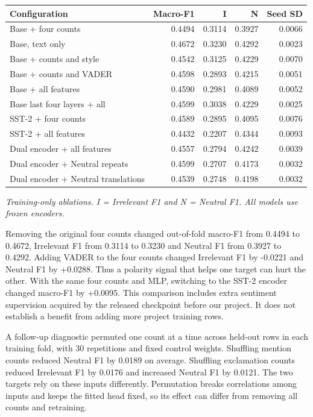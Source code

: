 \begin{center}\begin{minipage}{\linewidth}\centering\small
\begin{tabular}{lrrrr}
\toprule
Configuration & Macro-F1 & I & N & Seed SD \\
\midrule
Base + four counts & 0.4494 & 0.3114 & 0.3927 & 0.0066 \\
Base, text only & 0.4672 & 0.3230 & 0.4292 & 0.0023 \\
Base + counts and style & 0.4542 & 0.3125 & 0.4229 & 0.0070 \\
Base + counts and VADER & 0.4598 & 0.2893 & 0.4215 & 0.0051 \\
Base + all features & 0.4590 & 0.2981 & 0.4089 & 0.0052 \\
Base last four layers + all & 0.4599 & 0.3038 & 0.4229 & 0.0025 \\
SST-2 + four counts & 0.4589 & 0.2895 & 0.4095 & 0.0076 \\
SST-2 + all features & 0.4432 & 0.2207 & 0.4344 & 0.0093 \\
Dual encoder + all features & 0.4557 & 0.2794 & 0.4242 & 0.0039 \\
Dual encoder + Neutral repeats & 0.4599 & 0.2707 & 0.4173 & 0.0032 \\
Dual encoder + Neutral translations & 0.4539 & 0.2748 & 0.4198 & 0.0032 \\
\bottomrule
\end{tabular}
\par\smallskip\textit{Training-only ablations. I = Irrelevant F1 and N = Neutral F1. All models use frozen encoders.}
\end{minipage}\end{center}

Removing the original four counts changed out-of-fold macro-F1 from 0.4494 to 0.4672, Irrelevant F1 from 0.3114 to 0.3230 and Neutral F1 from 0.3927 to 0.4292. Adding VADER to the four counts changed Irrelevant F1 by -0.0221 and Neutral F1 by +0.0288. Thus a polarity signal that helps one target can hurt the other. With the same four counts and MLP, switching to the SST-2 encoder changed macro-F1 by +0.0095. This comparison includes extra sentiment supervision acquired by the released checkpoint before our project. It does not establish a benefit from adding more project training rows.

A follow-up diagnostic permuted one count at a time across held-out rows in each training fold, with 30 repetitions and fixed control weights. Shuffling mention counts reduced Neutral F1 by 0.0189 on average. Shuffling exclamation counts reduced Irrelevant F1 by 0.0176 and increased Neutral F1 by 0.0121. The two targets rely on these inputs differently. Permutation breaks correlations among inputs and keeps the fitted head fixed, so its effect can differ from removing all counts and retraining.

